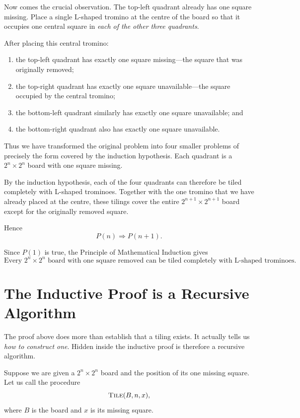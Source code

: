 \documentclass[12pt]{article}
\begin{document}
Now comes the crucial observation. The top-left quadrant already has
one square missing. Place a single L-shaped tromino at the centre of
the board so that it occupies one central square in \emph{each of the
other three quadrants}.

After placing this central tromino:

\begin{enumerate}
    \item the top-left quadrant has exactly one square missing---the
          square that was originally removed;
    \item the top-right quadrant has exactly one square unavailable---the
          square occupied by the central tromino;
    \item the bottom-left quadrant similarly has exactly one square
          unavailable; and
    \item the bottom-right quadrant also has exactly one square
          unavailable.
\end{enumerate}

Thus we have transformed the original problem into four smaller
problems of precisely the form covered by the induction hypothesis.
Each quadrant is a $2^n\times2^n$ board with one square missing.

By the induction hypothesis, each of the four quadrants can therefore
be tiled completely with L-shaped trominoes. Together with the one
tromino that we have already placed at the centre, these tilings cover
the entire $2^{n+1}\times2^{n+1}$ board except for the originally
removed square.

Hence
\[
        P(n)\Longrightarrow P(n+1).
\]

Since $P(1)$ is true, the Principle of Mathematical Induction gives
\[
\boxed{
\text{Every $2^n\times2^n$ board with one square removed can be
tiled completely with L-shaped trominoes.}
}
\]


\section{The Inductive Proof is a Recursive Algorithm}

The proof above does more than establish that a tiling exists. It
actually tells us \emph{how to construct one}. Hidden inside the
inductive proof is therefore a recursive algorithm.

Suppose we are given a $2^n\times2^n$ board and the position of its
one missing square. Let us call the procedure
\[
        \textsc{Tile}(B,n,x),
\]
where $B$ is the board and $x$ is its missing square.
\end{document}
